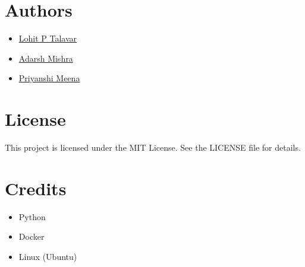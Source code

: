 \documentclass{article}
\begin{document}
\section{Authors}
\begin{itemize}
    \item \href{https://github.com/lohitpt252003}{Lohit P Talavar}
    \item \href{https://github.com/adarshmishra121}{Adarsh Mishra}
    \item \href{https://github.com/MeenaPriyanshi}{Priyanshi Meena}
\end{itemize}

\section{License}
This project is licensed under the MIT License. See the LICENSE file for details.

\section{Credits}
\begin{itemize}
    \item Python
    \item Docker
    \item Linux (Ubuntu)
\end{itemize}
\end{document}
